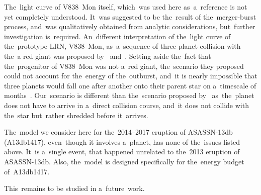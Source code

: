 \documentclass[galaxies,article,accept,moreauthors,pdftex]{mdpi}
\begin{document}
The~light curve of V838~Mon itself, which~was used here as~a~reference is not yet completely understood. It~was suggested to be the~result of the~merger-burst process, and~was qualitatively obtained from analytic considerations, but~further investigation is~required. An~different interpretation of the~light curve of the~prototype LRN, V838~Mon, as~a~sequence of three planet collision with the~a red giant was proposed by~\cite{RetterMarom2003} and~\cite{Retteretal2006}. Setting aside the~fact that the~progenitor of V838~Mon was not a~red giant, the~scenario they proposed could not account for the~energy of the~outburst, and~it is nearly impossible that three planets would fall one after another onto their parent star on a~timescale of months~\citep{TylendaSoker2006}. Our~scenario is different than the~scenario proposed by~\cite{RetterMarom2003} as~the~planet does not have to arrive in a~direct collision course, and~it does not collide with the~star but~rather shredded before it~arrives.

The~model we consider here for the~2014--2017 eruption of ASASSN-13db (A13db1417), even~though it involves a~planet, has none of the~issues listed above. It~is a~single event, that happened unrelated to the~2013 eruption of ASASSN-13db. Also, the~model is designed specifically for the~energy budget of~A13db1417.

This~remains to be studied in a~future~work. 
\vspace{6pt} 





\end{document}
